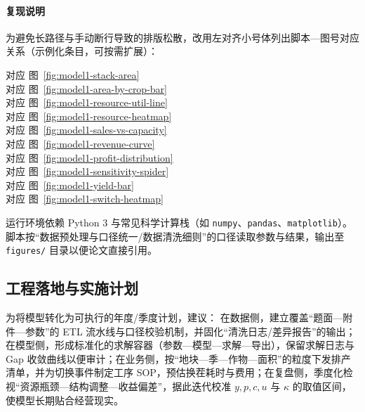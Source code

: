\paragraph{复现说明}
 为避免长路径与手动断行导致的排版松散，改用左对齐小号体列出脚本—图号对应关系（示例化条目，可按需扩展）：
 \begin{flushleft}\footnotesize
 \texttt{} 对应 图~\ref{fig:model1-stack-area}\\
 \texttt{} 对应 图~\ref{fig:model1-area-by-crop-bar}\\
 \texttt{} 对应 图~\ref{fig:model1-resource-util-line}\\
 \texttt{} 对应 图~\ref{fig:model1-resource-heatmap}\\
 \texttt{} 对应 图~\ref{fig:model1-sales-vs-capacity}\\
 \texttt{} 对应 图~\ref{fig:model1-revenue-curve}\\
 \texttt{} 对应 图~\ref{fig:model1-profit-distribution}\\
 \texttt{} 对应 图~\ref{fig:model1-sensitivity-spider}\\
 \texttt{} 对应 图~\ref{fig:model1-yield-bar}\\
 \texttt{} 对应 图~\ref{fig:model1-switch-heatmap}
 \end{flushleft}
 运行环境依赖 Python 3 与常见科学计算栈（如 \texttt{numpy}、\texttt{pandas}、\texttt{matplotlib}）。\linebreak[2]
 脚本按“数据预处理与口径统一/数据清洗细则”的口径读取参数与结果，输出至 \texttt{figures/} 目录以便论文直接引用。

\subsection{工程落地与实施计划}
为将模型转化为可执行的年度/季度计划，建议：
在数据侧，建立覆盖“题面—附件—参数”的 ETL 流水线与口径校验机制，并固化“清洗日志/差异报告”的输出；在模型侧，形成标准化的求解容器（参数—模型—求解—导出），保留求解日志与 Gap 收敛曲线以便审计；在业务侧，按“地块—季—作物—面积”的粒度下发排产清单，并为切换事件制定工序 SOP，预估换茬耗时与费用；在复盘侧，季度化检视“资源瓶颈—结构调整—收益偏差”，据此迭代校准 $y,p,c,u$ 与 $\kappa$ 的取值区间，使模型长期贴合经营现实。

